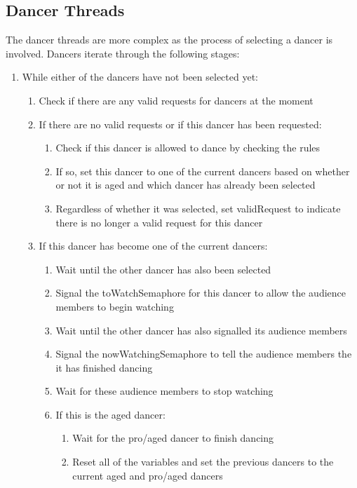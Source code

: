 \documentclass[12pt,a4paper]{scrartcl}
\begin{document}
\subsection{Dancer Threads}
The dancer threads are more complex as the process of selecting a dancer is involved.
Dancers iterate through the following stages:
\begin{enumerate}
    \item While either of the dancers have not been selected yet:
    \begin{enumerate}
        \item Check if there are any valid requests for dancers at the moment
        \item If there are no valid requests or if this dancer has been requested:
        \begin{enumerate}
            \item Check if this dancer is allowed to dance by checking the rules
            \item If so, set this dancer to one of the current dancers based on whether or not it is aged and which dancer has already been selected
            \item Regardless of whether it was selected, set validRequest to indicate there is no longer a valid request for this dancer
        \end{enumerate}
        \item If this dancer has become one of the current dancers:
        \begin{enumerate}
            \item Wait until the other dancer has also been selected
            \item Signal the toWatchSemaphore for this dancer to allow the audience members to begin watching
            \item Wait until the other dancer has also signalled its audience members
            \item Signal the nowWatchingSemaphore to tell the audience members the it has finished dancing
            \item Wait for these audience members to stop watching
            \item If this is the aged dancer:
            \begin{enumerate}
                \item Wait for the pro/aged dancer to finish dancing
                \item Reset all of the variables and set the previous dancers to the current aged and pro/aged dancers

\end{enumerate}
\end{enumerate}
\end{enumerate}
\end{enumerate}
\end{document}
